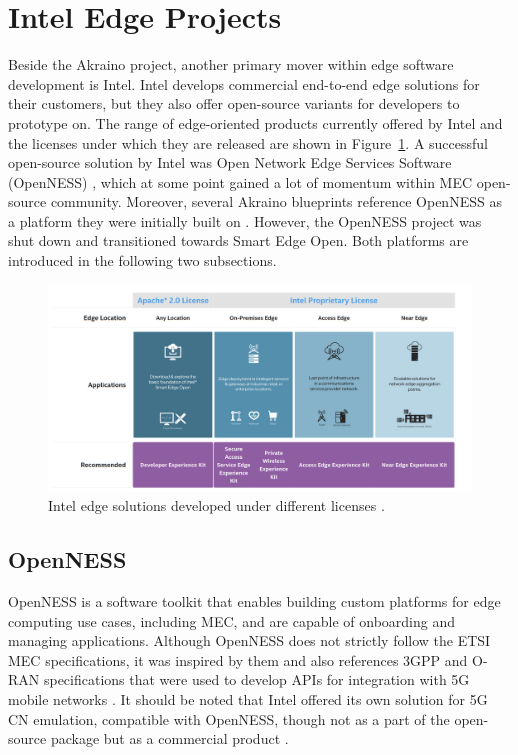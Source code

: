 \documentclass[12pt,a4paper,twoside]{report}
\begin{document}
\section{Intel Edge Projects}
Beside the Akraino project, another primary mover within edge software development is Intel. Intel develops commercial end-to-end edge solutions for their customers, but they also offer open-source variants for developers to prototype on. The range of edge-oriented products currently offered by Intel and the licenses under which they are released are shown in Figure~\ref{F:intel-solu}. A successful open-source solution by Intel was Open Network Edge Services Software (OpenNESS) \cite{sabella-mec-sw-dev}, which at some point gained a lot of momentum within MEC open-source community. Moreover, several Akraino blueprints reference OpenNESS as a platform they were initially built on \cite{cvb-docu,akraino-mec-slice-docu}. However, the OpenNESS project was shut down and transitioned towards Smart Edge Open. Both platforms are introduced in the following two subsections.
\begin{figure}[ht]
	\centering
	\includegraphics[width=13cm]{./images/intel-solu.png} 
	\caption{Intel edge solutions developed under different licenses \cite{seo-overview}.}
	\label{F:intel-solu}
\end{figure}

\subsection{OpenNESS}
OpenNESS is a software toolkit that enables building custom platforms for edge computing use cases, including MEC, and are capable of onboarding and managing applications. Although OpenNESS does not strictly follow the ETSI MEC specifications, it was inspired by them and also references 3GPP and O-RAN specifications that were used to develop APIs for integration with 5G mobile networks \cite{sabella-mec-sw-dev}. It should be noted that Intel offered its own solution for 5G CN emulation, compatible with OpenNESS, though not as a part of the open-source package but as a commercial product \cite{openness-git}.
\end{document}
